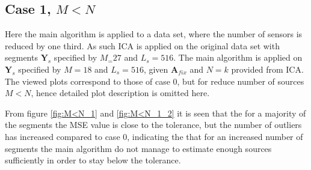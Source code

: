 \subsection{Case 1, $M<N$}
Here the main algorithm is applied to a data set, where the number of sensors is reduced by one third. As such ICA is applied on the original data set with segments $\textbf{Y}_s$ specified by $M_= 27$ and $L_s = 516$. The main algorithm is applied on $\textbf{Y}_s$ specified by $M=18$ and $L_s=516$, given $\textbf{A}_{fix}$ and $N = k$ provided from ICA.  
The viewed plots correspond to those of case 0, but for reduce number of sources $M<N$, hence detailed plot description is omitted here.   

From figure \ref{fig:M<N_1} and \ref{fig:M<N_1_2} it is seen that the for a majority of the segments the MSE value is close to the tolerance, but the number of outliers has increased compared to case 0, indicating the that for an increased number of segments the main algorithm do not manage to estimate enough  sources sufficiently in order to stay below the tolerance.   
